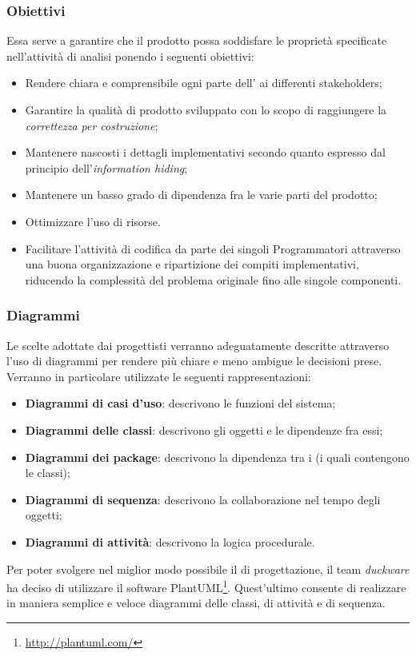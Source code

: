 \subsubsection{Obiettivi}
Essa serve a garantire che il prodotto possa soddisfare le proprietà specificate nell'attività di analisi ponendo i seguenti obiettivi:
\begin{itemize}
    \item Rendere chiara e comprensibile ogni parte dell' ai differenti stakeholders;
    \item Garantire la qualità di prodotto sviluppato con lo scopo di raggiungere la \textit{correttezza per costruzione};
    \item Mantenere nascosti i dettagli implementativi secondo quanto espresso dal principio dell'\textit{information hiding};
    \item Mantenere un basso grado di dipendenza fra le varie parti del prodotto;
    \item Ottimizzare l'uso di risorse.
    \item Facilitare l'attività di codifica da parte dei singoli Programmatori attraverso una buona organizzazione e ripartizione dei compiti implementativi, riducendo la complessità del problema originale fino alle singole componenti.
\end{itemize}
\subsubsection{Diagrammi}
Le scelte adottate dai progettisti verranno adeguatamente descritte attraverso l’uso di diagrammi  per rendere più chiare e meno ambigue le decisioni prese. Verranno in particolare utilizzate le seguenti rappresentazioni:
\begin{itemize}
	\item \textbf{Diagrammi di casi d’uso}: descrivono le funzioni del sistema;
	\item \textbf{Diagrammi delle classi}: descrivono gli oggetti e le dipendenze fra essi;
	\item \textbf{Diagrammi dei package}: descrivono la dipendenza tra i  (i quali contengono le classi);
	\item \textbf{Diagrammi di sequenza}: descrivono la collaborazione nel tempo degli oggetti;
	\item \textbf{Diagrammi di attività}: descrivono la logica procedurale.
\end{itemize}
Per poter svolgere nel miglior modo possibile il  di progettazione, il team \textit{duckware} ha deciso di utilizzare il software PlantUML\footnote{\href{http://plantuml.com/}{http://plantuml.com/}}. Quest'ultimo consente di realizzare in maniera semplice e veloce diagrammi delle classi, di attività e di sequenza.
